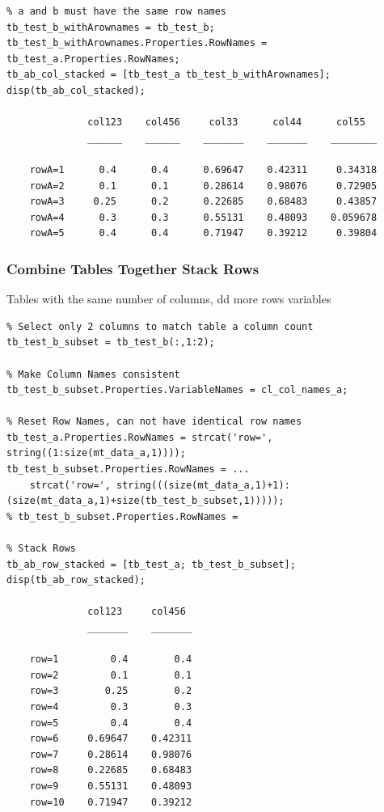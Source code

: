 \documentclass[
]{book}
\begin{document}
\begin{verbatim}
% a and b must have the same row names
tb_test_b_withArownames = tb_test_b;
tb_test_b_withArownames.Properties.RowNames = tb_test_a.Properties.RowNames;
tb_ab_col_stacked = [tb_test_a tb_test_b_withArownames];
disp(tb_ab_col_stacked);

              col123    col456     col33      col44      col55  
              ______    ______    _______    _______    ________

    rowA=1      0.4      0.4      0.69647    0.42311     0.34318
    rowA=2      0.1      0.1      0.28614    0.98076     0.72905
    rowA=3     0.25      0.2      0.22685    0.68483     0.43857
    rowA=4      0.3      0.3      0.55131    0.48093    0.059678
    rowA=5      0.4      0.4      0.71947    0.39212     0.39804
\end{verbatim}

\hypertarget{combine-tables-together-stack-rows}{%
\subsubsection{Combine Tables Together Stack Rows}\label{combine-tables-together-stack-rows}}

Tables with the same number of columns, dd more rows variables

\begin{verbatim}
% Select only 2 columns to match table a column count
tb_test_b_subset = tb_test_b(:,1:2);

% Make Column Names consistent
tb_test_b_subset.Properties.VariableNames = cl_col_names_a;

% Reset Row Names, can not have identical row names
tb_test_a.Properties.RowNames = strcat('row=', string((1:size(mt_data_a,1))));
tb_test_b_subset.Properties.RowNames = ...
    strcat('row=', string(((size(mt_data_a,1)+1):(size(mt_data_a,1)+size(tb_test_b_subset,1)))));
% tb_test_b_subset.Properties.RowNames =

% Stack Rows
tb_ab_row_stacked = [tb_test_a; tb_test_b_subset];
disp(tb_ab_row_stacked);

              col123     col456 
              _______    _______

    row=1         0.4        0.4
    row=2         0.1        0.1
    row=3        0.25        0.2
    row=4         0.3        0.3
    row=5         0.4        0.4
    row=6     0.69647    0.42311
    row=7     0.28614    0.98076
    row=8     0.22685    0.68483
    row=9     0.55131    0.48093
    row=10    0.71947    0.39212
\end{verbatim}
\end{document}
